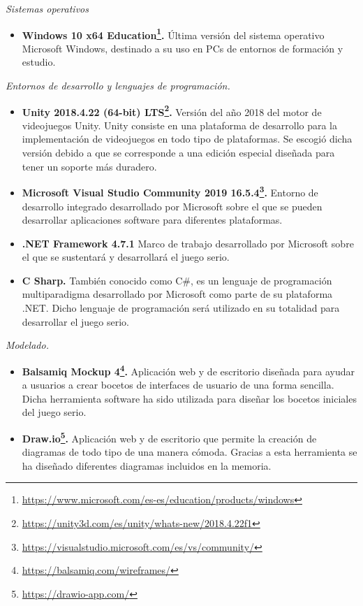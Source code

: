 \emph{Sistemas operativos}
\begin{itemize}
	\item \textbf{Windows 10 x64 Education\footnote{\url{https://www.microsoft.com/es-es/education/products/windows}}.} Última versión del sistema operativo Microsoft Windows, destinado a su uso en PCs de entornos de formación y estudio.
\end{itemize}

\emph{Entornos de desarrollo y lenguajes de programación.}
\begin{itemize}
	\item \textbf{Unity 2018.4.22 (64-bit) LTS\footnote{\url{https://unity3d.com/es/unity/whats-new/2018.4.22f1}}.} Versión del año 2018 del motor de videojuegos Unity. Unity consiste en una plataforma de desarrollo para la implementación de videojuegos en todo tipo de plataformas. Se escogió dicha versión debido a que se corresponde a una edición especial diseñada para tener un soporte más duradero.
	\item \textbf{Microsoft Visual Studio Community 2019 16.5.4\footnote{\url{https://visualstudio.microsoft.com/es/vs/community/}}.} Entorno de desarrollo integrado desarrollado por Microsoft sobre el que se pueden desarrollar aplicaciones software para diferentes plataformas.
	\item \textbf{.NET Framework 4.7.1} Marco de trabajo desarrollado por Microsoft sobre el que se sustentará y desarrollará el juego serio.
	\item \textbf{C Sharp.} También conocido como C\#, es un lenguaje de programación multiparadigma desarrollado por Microsoft como parte de su plataforma .NET. Dicho lenguaje de programación será utilizado en su totalidad para desarrollar el juego serio.
\end{itemize}

\emph{Modelado.}
\begin{itemize}
	\item \textbf{Balsamiq Mockup 4\footnote{\url{https://balsamiq.com/wireframes/}}.} Aplicación web y de escritorio diseñada para ayudar a usuarios a crear bocetos de interfaces de usuario de una forma sencilla. Dicha herramienta software ha sido utilizada para diseñar los bocetos iniciales del juego serio.
	\item \textbf{Draw.io\footnote{\url{https://drawio-app.com/}}.} Aplicación web y de escritorio que permite la creación de diagramas de todo tipo de una manera cómoda. Gracias a esta herramienta se ha diseñado diferentes diagramas incluidos en la memoria.
\end{itemize}

